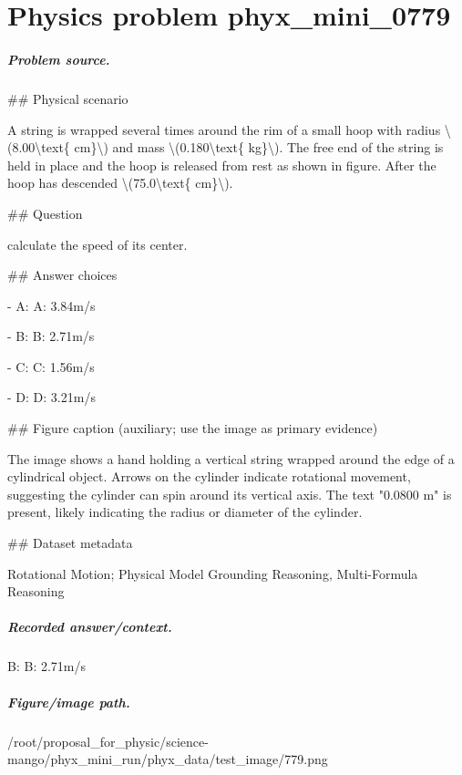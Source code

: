
\chapter{Physics problem phyx\_mini\_0779}
\label{ch:PhyXMiniProblems_problem_phyx_mini_0779}

\paragraph{Problem source.}
\#\# Physical scenario

A string is wrapped several times around the rim of a small hoop with radius \textbackslash{}(8.00\textbackslash{}text\{ cm\}\textbackslash{}) and mass \textbackslash{}(0.180\textbackslash{}text\{ kg\}\textbackslash{}). The free end of the string is held in place and the hoop is released from rest as shown in figure. After the hoop has descended \textbackslash{}(75.0\textbackslash{}text\{ cm\}\textbackslash{}).

\#\# Question

calculate the speed of its center.

\#\# Answer choices

- A: A: 3.84m/s

- B: B: 2.71m/s

- C: C: 1.56m/s

- D: D: 3.21m/s

\#\# Figure caption (auxiliary; use the image as primary evidence)

The image shows a hand holding a vertical string wrapped around the edge of a cylindrical object. Arrows on the cylinder indicate rotational movement, suggesting the cylinder can spin around its vertical axis. The text "0.0800 m" is present, likely indicating the radius or diameter of the cylinder.

\#\# Dataset metadata

Rotational Motion; Physical Model Grounding Reasoning, Multi-Formula Reasoning

\paragraph{Recorded answer/context.}
B: B: 2.71m/s

\paragraph{Figure/image path.}
/root/proposal\_for\_physic/science-mango/phyx\_mini\_run/phyx\_data/test\_image/779.png

